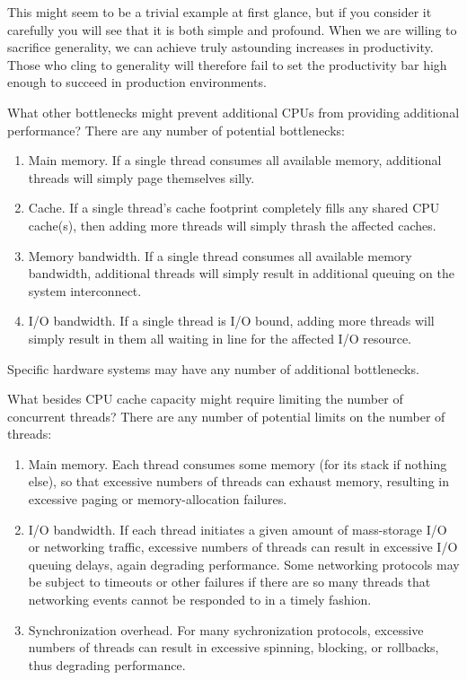 	This might seem to be a trivial example at first glance,
	but if you consider it carefully you will see that it is
	both simple and profound.
	When we are willing to sacrifice generality, we can achieve
	truly astounding increases in productivity.
	Those who cling to generality will therefore fail to set
	the productivity bar high enough to succeed in production
	environments.

\QuickQ{}
	What other bottlenecks might prevent additional CPUs from
	providing additional performance?
\QuickA{}
	There are any number of potential bottlenecks:
	\begin{enumerate}
	\item	Main memory.  If a single thread consumes all available
		memory, additional threads will simply page themselves
		silly.
	\item	Cache.  If a single thread's cache footprint completely
		fills any shared CPU cache(s), then adding more threads
		will simply thrash the affected caches.
	\item	Memory bandwidth.  If a single thread consumes all available
		memory bandwidth, additional threads will simply
		result in additional queuing on the system interconnect.
	\item	I/O bandwidth.  If a single thread is I/O bound,
		adding more threads will simply result in them all
		waiting in line for the affected I/O resource.
	\end{enumerate}

	Specific hardware systems may have any number of additional
	bottlenecks.

\QuickQ{}
	What besides CPU cache capacity might require limiting the
	number of concurrent threads?
\QuickA{}
	There are any number of potential limits on the number of
	threads:
	\begin{enumerate}
	\item	Main memory.  Each thread consumes some memory
		(for its stack if nothing else), so that excessive
		numbers of threads can exhaust memory, resulting
		in excessive paging or memory-allocation failures.
	\item	I/O bandwidth.  If each thread initiates a given
		amount of mass-storage I/O or networking traffic,
		excessive numbers of threads can result in excessive
		I/O queuing delays, again degrading performance.
		Some networking protocols may be subject to timeouts
		or other failures if there are so many threads that
		networking events cannot be responded to in a timely
		fashion.
	\item	Synchronization overhead.
		For many sychronization protocols, excessive numbers
		of threads can result in excessive spinning, blocking,
		or rollbacks, thus degrading performance.
	\end{enumerate}

